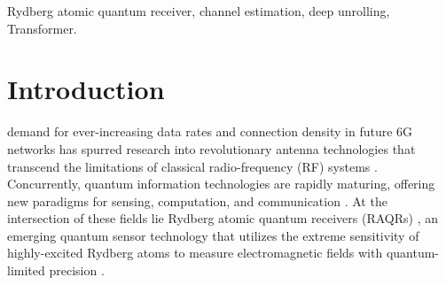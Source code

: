 \documentclass[journal]{IEEEtran}
\begin{document}
\begin{IEEEkeywords}
Rydberg atomic quantum receiver, channel estimation, deep unrolling, Transformer.
\end{IEEEkeywords}

\IEEEpeerreviewmaketitle

\section{Introduction}
 demand for ever-increasing data rates and connection density in future 6G networks has spurred research into revolutionary antenna technologies that transcend the limitations of classical radio-frequency (RF) systems \cite{11026007, 10985904}. Concurrently, quantum information technologies are rapidly maturing, offering new paradigms for sensing, computation, and communication \cite{b5}. At the intersection of these fields lie Rydberg atomic quantum receivers (RAQRs) \cite{b4}, an emerging quantum sensor technology that utilizes the extreme sensitivity of highly-excited Rydberg atoms to measure electromagnetic fields with quantum-limited precision \cite{b2}.

\end{document}

